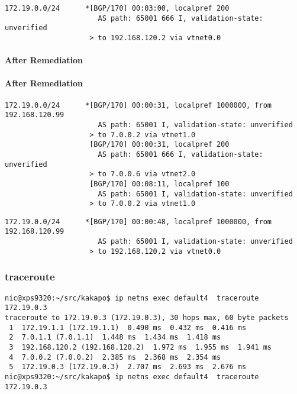 \begin{lstlisting}[title=As seen at ASBR2]
172.19.0.0/24      *[BGP/170] 00:03:00, localpref 200
                      AS path: 65001 666 I, validation-state: unverified
                    > to 192.168.120.2 via vtnet0.0
\end{lstlisting}

\paragraph{After Remediation}
\paragraph{After Remediation}

\begin{lstlisting}[title=As seen at ASBR1]
172.19.0.0/24      *[BGP/170] 00:00:31, localpref 1000000, from 192.168.120.99
                      AS path: 65001 I, validation-state: unverified
                    > to 7.0.0.2 via vtnet1.0
                    [BGP/170] 00:00:31, localpref 200
                      AS path: 65001 666 I, validation-state: unverified
                    > to 7.0.0.6 via vtnet2.0
                    [BGP/170] 00:08:11, localpref 100
                      AS path: 65001 I, validation-state: unverified
                    > to 7.0.0.2 via vtnet1.0
\end{lstlisting}

\begin{lstlisting}[title=As seen at ASBR2]
172.19.0.0/24      *[BGP/170] 00:00:48, localpref 1000000, from 192.168.120.99
                      AS path: 65001 I, validation-state: unverified
                    > to 192.168.120.2 via vtnet0.0
\end{lstlisting}

\subsubsection{traceroute}
\begin{lstlisting}[title=traceroute for normal state\, showing dataplane transit through four virtual routers]
nic@xps9320:~/src/kakapo$ ip netns exec default4  traceroute 172.19.0.3
traceroute to 172.19.0.3 (172.19.0.3), 30 hops max, 60 byte packets
 1  172.19.1.1 (172.19.1.1)  0.490 ms  0.432 ms  0.416 ms
 2  7.0.1.1 (7.0.1.1)  1.448 ms  1.434 ms  1.418 ms
 3  192.168.120.2 (192.168.120.2)  1.972 ms  1.955 ms  1.941 ms
 4  7.0.0.2 (7.0.0.2)  2.385 ms  2.368 ms  2.354 ms
 5  172.19.0.3 (172.19.0.3)  2.707 ms  2.693 ms  2.676 ms
nic@xps9320:~/src/kakapo$ ip netns exec default4  traceroute 172.19.0.3
\end{lstlisting}

